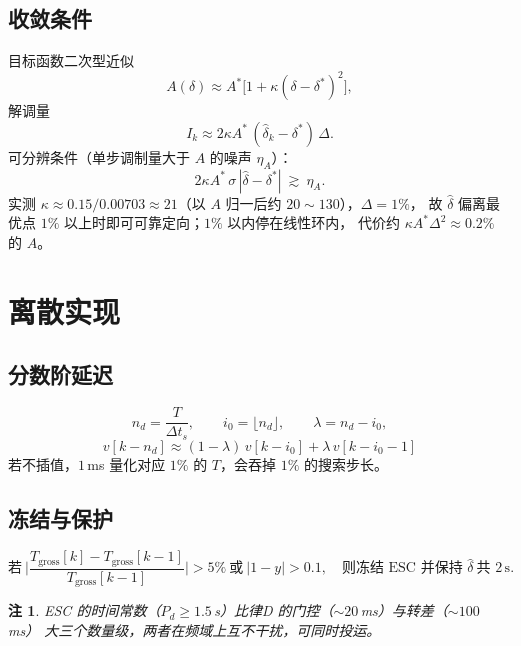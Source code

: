 \documentclass[UTF8,fontset=windows,a4paper,11pt]{ctexart}
\newtheorem{remark}{注}
\newcommand{\Tg}{T_{\mathrm{gross}}}
\begin{document}
\subsection{收敛条件}
目标函数二次型近似
\begin{equation}
A(\delta)\approx A^{*}\Big[1+\kappa(\delta-\delta^{*})^2\Big],
\end{equation}
解调量
\begin{equation}
I_k\approx2\kappa A^{*}\,(\hat\delta_k-\delta^{*})\,\Delta .
\end{equation}
可分辨条件（单步调制量大于 $A$ 的噪声 $\eta_A$）：
\begin{equation}
2\kappa A^{*}\,\sigma\,|\hat\delta-\delta^{*}|\ \gtrsim\ \eta_A .
\end{equation}
实测 $\kappa\approx0.15/0.00703\approx21$（以 $A$ 归一后约 $20\sim130$），$\Delta=1\%$，
故 $\hat\delta$ 偏离最优点 $1\%$ 以上时即可可靠定向；$1\%$ 以内停在线性环内，
代价约 $\kappa A^{*}\Delta^2\approx0.2\%$ 的 $A$。

\section{离散实现}

\subsection{分数阶延迟}
\begin{equation}
n_d=\frac{T}{\Delta t_s},\qquad i_0=\lfloor n_d\rfloor,\qquad \lambda=n_d-i_0,
\end{equation}
\begin{equation}
\boxed{\;v[k-n_d]\approx(1-\lambda)\,v[k-i_0]+\lambda\,v[k-i_0-1]\;}
\end{equation}
若不插值，$1$\,ms 量化对应 $1\%$ 的 $T$，会吞掉 $1\%$ 的搜索步长。

\subsection{冻结与保护}
\begin{equation}
\text{若}\ \Big|\frac{\Tg[k]-\Tg[k-1]}{\Tg[k-1]}\Big|>5\%\ \text{或}\ |1-y|>0.1,
\quad\text{则冻结 ESC 并保持 }\hat\delta\ \text{共 }2\,\mathrm{s}.
\end{equation}

\begin{remark}
ESC 的时间常数（$P_d\ge1.5$\,s）比律D 的门控（$\sim20$\,ms）与转差（$\sim100$\,ms）
大三个数量级，两者在频域上互不干扰，可同时投运。
\end{remark}
\end{document}
